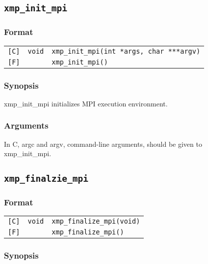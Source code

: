 \subsection{\tt xmp\_init\_mpi}

\subsubsection*{Format}

\begin{tabular}{lll}

\verb![C]!&  {\tt void}& {\tt xmp\_init\_mpi(int *args, char ***argv)}\\

\verb![F]!&  {\tt }& {\tt xmp\_init\_mpi()}
\end{tabular}

\subsubsection*{Synopsis}

   xmp\_init\_mpi initializes MPI execution environment.

\subsubsection*{Arguments}

   In C, argc and argv, command-line arguments, should be given to xmp\_init\_mpi.


\subsection{\tt xmp\_finalzie\_mpi}

\subsubsection*{Format}

\begin{tabular}{lll}

\verb![C]!&  {\tt void}& {\tt xmp\_finalize\_mpi(void)}\\

\verb![F]!&  {\tt }& {\tt xmp\_finalize\_mpi()}
\end{tabular}

\subsubsection*{Synopsis}

